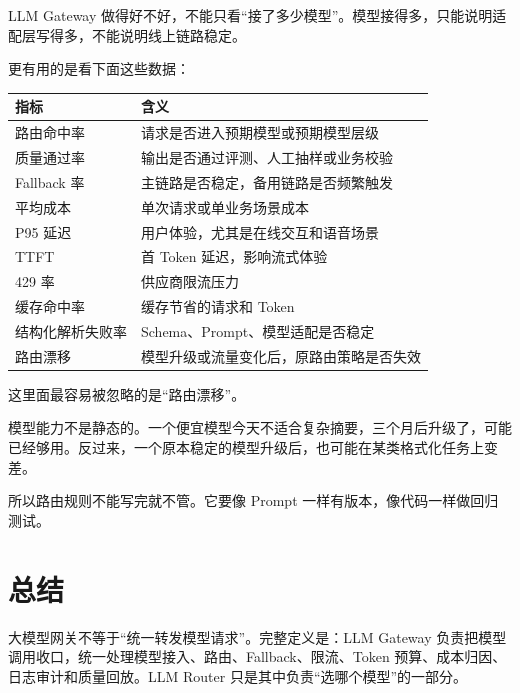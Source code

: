 \documentclass[9pt,a4paper,twocolumn]{ctexart}
\begin{document}
LLM Gateway 做得好不好，不能只看“接了多少模型”。模型接得多，只能说明适配层写得多，不能说明线上链路稳定。



更有用的是看下面这些数据：


{\footnotesize
\begin{tabular}{|p{}|p{}|}
\hline
\textbf{指标} & \textbf{含义} \\
\hline
路由命中率 & 请求是否进入预期模型或预期模型层级 \\
\hline
质量通过率 & 输出是否通过评测、人工抽样或业务校验 \\
\hline
Fallback 率 & 主链路是否稳定，备用链路是否频繁触发 \\
\hline
平均成本 & 单次请求或单业务场景成本 \\
\hline
P95 延迟 & 用户体验，尤其是在线交互和语音场景 \\
\hline
TTFT & 首 Token 延迟，影响流式体验 \\
\hline
429 率 & 供应商限流压力 \\
\hline
缓存命中率 & 缓存节省的请求和 Token \\
\hline
结构化解析失败率 & Schema、Prompt、模型适配是否稳定 \\
\hline
路由漂移 & 模型升级或流量变化后，原路由策略是否失效 \\
\hline
\end{tabular}
}



这里面最容易被忽略的是“路由漂移”。



模型能力不是静态的。一个便宜模型今天不适合复杂摘要，三个月后升级了，可能已经够用。反过来，一个原本稳定的模型升级后，也可能在某类格式化任务上变差。



所以路由规则不能写完就不管。它要像 Prompt 一样有版本，像代码一样做回归测试。



\section*{总结}


大模型网关不等于“统一转发模型请求”。完整定义是：LLM Gateway 负责把模型调用收口，统一处理模型接入、路由、Fallback、限流、Token 预算、成本归因、日志审计和质量回放。LLM Router 只是其中负责“选哪个模型”的一部分。
\end{document}
